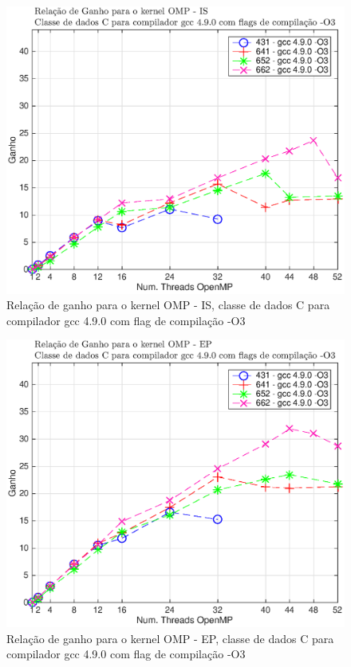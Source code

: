 \documentclass[conference,compsoc]{IEEEtran}
\begin{document}
\begin{figure}[H]
\centering
\includegraphics[width=1.1\columnwidth]{EPS/OMP/ganho_is_03.eps}
\caption{Relação de ganho para o kernel OMP - IS, classe de dados C para  compilador gcc 4.9.0 com flag de compilação -O3}
\label{ganho_omp_is_c}
\end{figure}

\begin{figure}[H]
\centering
\includegraphics[width=1.1\columnwidth]{EPS/OMP/ganho_ep_03.eps}
\caption{Relação de ganho para o kernel OMP - EP, classe de dados C para  compilador gcc 4.9.0 com flag de compilação -O3}
\label{ganho_omp_ep_c}
\end{figure}
\end{document}
